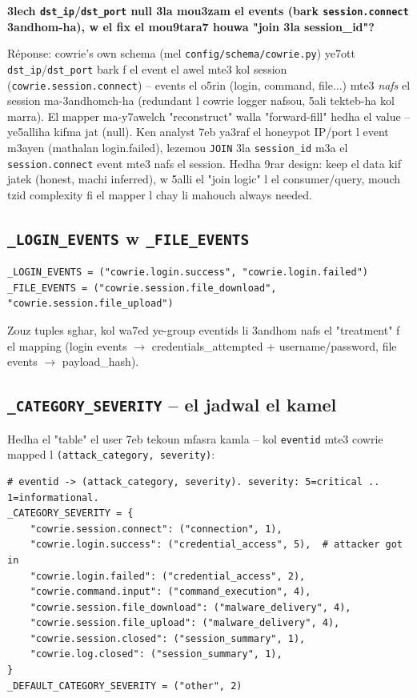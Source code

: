 \documentclass[11pt,a4paper]{report}
\DeclareRobustCommand{\code}[1]{\texttt{#1}}
\begin{document}
\begin{soual}
\textbf{3lech \code{dst\_ip}/\code{dst\_port} null 3la mou3zam el events
(bark \code{session.connect} 3andhom-ha), w el fix el mou9tara7 houwa
"join 3la session\_id"?}

Réponse: cowrie's own schema (mel \code{config/schema/cowrie.py}) ye7ott
\code{dst\_ip}/\code{dst\_port} bark f el event el awel mte3 kol session
(\code{cowrie.session.connect}) -- events el o5rin (login, command, file...)
mte3 \emph{nafs} el session ma-3andhomch-ha (redundant l cowrie logger
nafsou, 5ali tekteb-ha kol marra). El mapper ma-y7awelch "reconstruct" walla
"forward-fill" hedha el value -- ye5alliha kifma jat (null). Ken analyst
7eb ya3raf el honeypot IP/port l event m3ayen (mathalan login.failed),
lezemou \code{JOIN} 3la \code{session\_id} m3a el \code{session.connect}
event mte3 nafs el session. Hedha 9rar design: keep el data kif jatek
(honest, machi inferred), w 5alli el "join logic" l el consumer/query,
mouch tzid complexity fi el mapper l chay li mahouch always needed.
\end{soual}

\subsection{\code{\_LOGIN\_EVENTS} w \code{\_FILE\_EVENTS}}

\begin{lstlisting}[style=pystyle]
_LOGIN_EVENTS = ("cowrie.login.success", "cowrie.login.failed")
_FILE_EVENTS = ("cowrie.session.file_download", "cowrie.session.file_upload")
\end{lstlisting}

Zouz tuples sghar, kol wa7ed ye-group eventids li 3andhom nafs el
"treatment" f el mapping (login events $\to$ credentials\_attempted +
username/password, file events $\to$ payload\_hash).

\subsection{\code{\_CATEGORY\_SEVERITY} -- el jadwal el kamel}

Hedha el "table" el user 7eb tekoun mfasra kamla -- kol \code{eventid}
mte3 cowrie mapped l \code{(attack\_category, severity)}:

\begin{lstlisting}[style=pystyle]
# eventid -> (attack_category, severity). severity: 5=critical .. 1=informational.
_CATEGORY_SEVERITY = {
    "cowrie.session.connect": ("connection", 1),
    "cowrie.login.success": ("credential_access", 5),  # attacker got in
    "cowrie.login.failed": ("credential_access", 2),
    "cowrie.command.input": ("command_execution", 4),
    "cowrie.session.file_download": ("malware_delivery", 4),
    "cowrie.session.file_upload": ("malware_delivery", 4),
    "cowrie.session.closed": ("session_summary", 1),
    "cowrie.log.closed": ("session_summary", 1),
}
_DEFAULT_CATEGORY_SEVERITY = ("other", 2)
\end{lstlisting}
\end{document}

